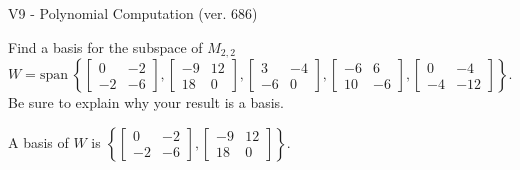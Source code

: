 \begin{exercise}
  \begin{exerciseTitle}V9 - Polynomial Computation (ver. 686)\end{exerciseTitle}
  \begin{exerciseStatement}
    Find a basis for the subspace of \(M_{2,2}\) 
\[W=\mathrm{span}\ \left\{\left[\begin{array}{cc}
0 & -2 \\
-2 & -6
\end{array}\right] , \left[\begin{array}{cc}
-9 & 12 \\
18 & 0
\end{array}\right] , \left[\begin{array}{cc}
3 & -4 \\
-6 & 0
\end{array}\right] , \left[\begin{array}{cc}
-6 & 6 \\
10 & -6
\end{array}\right] , \left[\begin{array}{cc}
0 & -4 \\
-4 & -12
\end{array}\right]\right\}.\]
 Be sure to explain why your result is a basis.


  \end{exerciseStatement}
  \begin{exerciseAnswer}
   A basis of \(W\) is  \(\left\{\left[\begin{array}{cc}
0 & -2 \\
-2 & -6
\end{array}\right] , \left[\begin{array}{cc}
-9 & 12 \\
18 & 0
\end{array}\right]\right\}\).
  


  \end{exerciseAnswer}
\end{exercise}